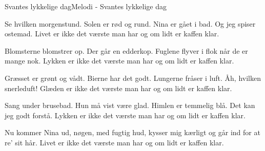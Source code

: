 \begin{sang}{Svantes lykkelige dag}{Melodi - Svantes lykkelige dag}
\begin{vers}
Se hvilken morgenstund. 
Solen er rød og rund.
Nina er gået i bad. 
Og jeg spiser ostemad.
Livet er ikke det værste man har
og om lidt er kaffen klar.
\end{vers}
\begin{vers}
Blomsterne blomstrer op.
Der går en edderkop.
Fuglene flyver i flok 
når de er mange nok.
Lykken er ikke det værste man har
og om lidt er kaffen klar.
\end{vers}
\vfill
\begin{vers}
Græsset er grønt og vådt.
Bierne har det godt.    
Lungerne fråser i luft. 
Åh, hvilken snerleduft! 
Glæden  er ikke det værste man har
og om lidt er kaffen klar.
\end{vers}
\begin{vers}
Sang under brusebad.
Hun må vist være glad.
Himlen er temmelig blå.
Det kan jeg godt forstå.
Lykken er ikke det værste man har
og om lidt er kaffen klar.
\end{vers}
\begin{vers}
Nu kommer Nina ud,
nøgen, med fugtig hud,
kysser mig kærligt og går
ind for at re' sit hår. 
Livet  er ikke det værste man har
og om lidt er kaffen klar.
\end{vers}
\laps
\end{sang}
